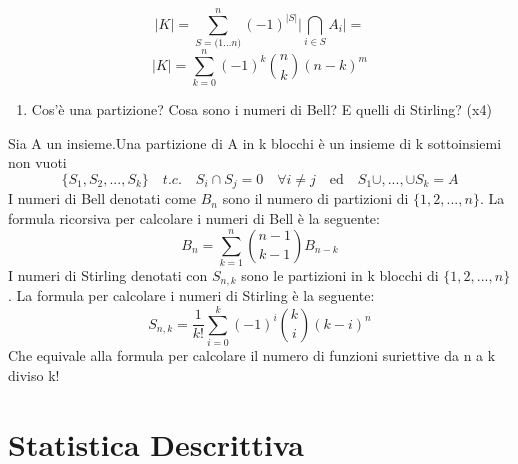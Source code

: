  \[\vert K \vert = \sum_{S = {(1...n})}^{n} (-1)^{\vert S \vert} \vert\bigcap\limits_{i\in S} A_{i}\vert = \]
\[\vert K \vert  = \sum_{k=0}^{n}(-1)^k \binom{n}{k} (n-k)^m\]
\begin{enumerate}[resume]\bfseries
\item Cos'è una partizione? Cosa sono i numeri di Bell? E quelli di Stirling? (x4)
\end{enumerate}
Sia A un insieme.\newline Una partizione di A in k blocchi è  un insieme di k sottoinsiemi non vuoti
\[\{ S_1,S_2,...,S_k\}\quad  t.c. \quad S_i \cap S_j = 0 \quad \forall i \ne j \quad \text{ed} \quad S_1\cup,...,\cup S_k = A\]
I numeri di Bell denotati come $B_n$ sono il numero di partizioni di $\{1,2,...,n\}$.
La formula ricorsiva per calcolare i numeri di Bell è la seguente: \[B_n = \sum_{k =1}^{n} \binom{n-1}{k-1}B_{n-k}\]
I numeri di Stirling denotati con $S_{n,k}$ sono le partizioni in k blocchi di $\{1,2,...,n\}$.
La formula per calcolare i numeri di Stirling è la seguente:
\[S_{n,k} = \frac{1}{k!}\sum_{i=0}^{k}(-1)^i \binom{k}{i} (k-i)^n\]
Che equivale alla formula per calcolare il numero di funzioni suriettive da  n a k diviso k!

\section{Statistica Descrittiva}

